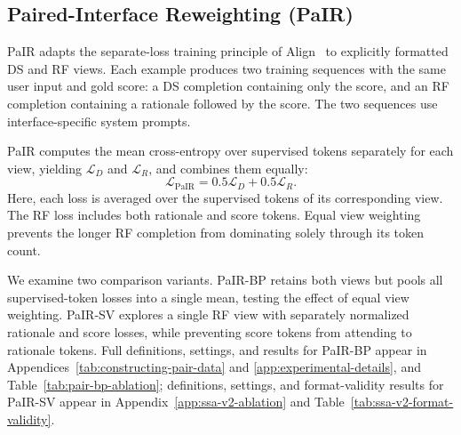 \subsection{Paired-Interface Reweighting (PaIR)}

PaIR adapts the separate-loss training principle of
Align~\citep{shi-etal-2025-investigating} to explicitly formatted DS and RF
views. Each example produces two training sequences with the same user
input and gold score: a DS completion containing only the score, and an
RF completion containing a rationale followed by the score. The two
sequences use interface-specific system prompts.

PaIR computes the mean cross-entropy over supervised tokens
separately for each view, yielding \(\mathcal{L}_D\) and
\(\mathcal{L}_R\), and combines them equally:
\[
\mathcal{L}_{\mathrm{PaIR}}
=
0.5\mathcal{L}_D
+
0.5\mathcal{L}_R.
\]
Here, each loss is averaged over the supervised tokens of its corresponding
view. The RF loss includes both rationale and score tokens. Equal view
weighting prevents the longer RF completion from dominating solely through
its token count.

We examine two comparison variants.
PaIR-BP retains both views but pools all supervised-token losses
into a single mean, testing the effect of equal view weighting.
PaIR-SV explores a single RF view with separately normalized
rationale and score losses, while preventing score tokens
from attending to rationale tokens.
Full definitions, settings, and results for PaIR-BP appear in
Appendices~\ref{tab:constructing-pair-data} and
\ref{app:experimental-details}, and Table~\ref{tab:pair-bp-ablation};
definitions, settings, and
format-validity results for PaIR-SV appear in
Appendix~\ref{app:ssa-v2-ablation} and
Table~\ref{tab:ssa-v2-format-validity}.


